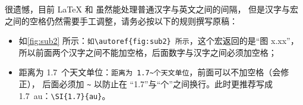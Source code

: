 很遗憾，目前 \LaTeX{} 和 \CTeX{} 虽然能处理普通汉字与英文之间的间隔，
但是汉字与宏之间的空格仍然需要手工调整，请务必按以下的规则撰写原稿：
\begin{itemize}
  \item[\ding{51}] 如\autoref{fig:sub2} 所示：\verb|如\autoref{fig:sub2} 所示|，这个宏返回的是“图 x.xx”，
  所以前面两个汉字之间不能加空格，后面数字与汉字之间必须加空格；
  \item[\ding{51}] 距离为 1.7~个天文单位：\verb|距离为 1.7~个天文单位|，前面可以不加空格（\CTeX 会修正），
  后面必须加 \verb|~| 以防止在 “1.7”与“个”之间换行。此时更推荐写成 \SI{1.7}{au}：\verb|\SI{1.7}{au}|。
\end{itemize}
